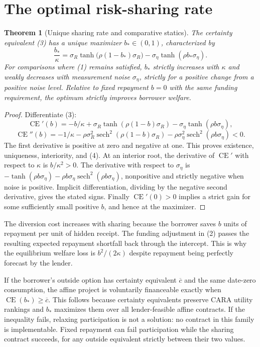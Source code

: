 \documentclass[11pt,a4paper]{article}
\newtheorem{theorem}{Theorem}[section]
\theoremstyle{remark}
\begin{document}
\section{The optimal risk-sharing rate}
\begin{theorem}[Unique sharing rate and comparative statics]
The certainty equivalent (3) has a unique maximizer $b_*\in(0,1)$, characterized by
\[
 \frac{b_*}{\kappa}
 =\sigma_R\tanh\big(\rho(1-b_*)\sigma_R\big)
  -\sigma_\eta\tanh(\rho b_*\sigma_\eta). \tag{4}
\]
For comparisons where (1) remains satisfied, $b_*$ strictly increases with $\kappa$ and weakly decreases with measurement noise $\sigma_\eta$, strictly for a positive change from a positive noise level. Relative to fixed repayment $b=0$ with the same funding requirement, the optimum strictly improves borrower welfare.
\end{theorem}
\begin{proof}
Differentiate (3):
\[
 \operatorname{CE}'(b)=-b/\kappa+
 \sigma_R\tanh(\rho(1-b)\sigma_R)
 -\sigma_\eta\tanh(\rho b\sigma_\eta),
\]
\[
 \operatorname{CE}''(b)=-1/\kappa
 -\rho\sigma_R^2\operatorname{sech}^2(\rho(1-b)\sigma_R)
 -\rho\sigma_\eta^2\operatorname{sech}^2(\rho b\sigma_\eta)<0.
\]
The first derivative is positive at zero and negative at one. This proves existence, uniqueness, interiority, and (4). At an interior root, the derivative of $\operatorname{CE}'$ with respect to $\kappa$ is $b/\kappa^2>0$. The derivative with respect to $\sigma_\eta$ is
$-\tanh(\rho b\sigma_\eta)-\rho b\sigma_\eta\operatorname{sech}^2(\rho b\sigma_\eta)$, nonpositive and strictly negative when noise is positive. Implicit differentiation, dividing by the negative second derivative, gives the stated signs. Finally $\operatorname{CE}'(0)>0$ implies a strict gain for some sufficiently small positive $b$, and hence at the maximizer.
\end{proof}
The diversion cost increases with sharing because the borrower saves $b$ units of repayment per unit of hidden receipt. The funding adjustment in (2) passes the resulting expected repayment shortfall back through the intercept. This is why the equilibrium welfare loss is $b^2/(2\kappa)$ despite repayment being perfectly forecast by the lender.

If the borrower's outside option has certainty equivalent $\overline c$ and the same date-zero consumption, the affine project is voluntarily financeable exactly when $\operatorname{CE}(b_*)\ge\overline c$. This follows because certainty equivalents preserve CARA utility rankings and $b_*$ maximizes them over all lender-feasible affine contracts. If the inequality fails, relaxing participation is not a solution: no contract in this family is implementable. Fixed repayment can fail participation while the sharing contract succeeds, for any outside equivalent strictly between their two values.
\end{document}
